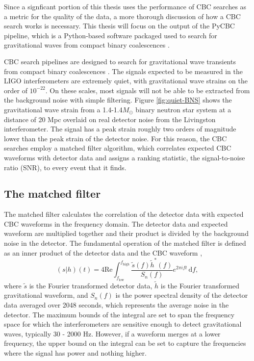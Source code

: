 Since a signficant portion of this thesis uses the performance of 
CBC searches as a metric for the quality of the 
data, a more thorough discussion of how a CBC search 
works is necessary. This thesis will focus on the output of the PyCBC 
pipeline, which is a Python-based software packaged used to search for 
gravitational waves from compact binary coalescences \cite{Usman:2015kfa,pycbc-github}.

CBC search pipelines are designed to search for gravitational wave transients 
from compact binary coalescences \cite{Usman:2015kfa}. 
The signals expected to be measured in the LIGO interferometers are extremely quiet, 
with gravitational wave strains on the order of $10^{-22}$. On these scales, most 
signals will not be able to be extracted from the background noise with simple filtering. 
Figure \ref{fig:quiet-BNS} shows the gravitational wave strain from a 1.4-1.4$M_{\odot}$ 
binary neutron star system at a distance of 20 Mpc overlaid on real detector noise from 
the Livingston 
interferometer. The signal has a peak strain roughly two orders of magnitude lower than 
the peak strain of the detector noise. 
For this reason, the CBC searches employ a matched filter algorithm, which correlates 
expected CBC
waveforms with detector data and assigns a ranking statistic, the signal-to-noise 
ratio (SNR), to every event that it finds. 

\subsection{The matched filter}

The matched filter calculates the correlation of the detector data with expected CBC 
waveforms in the frequency domain. The detector data and expected waveform are 
multiplied together and their product is divided by the background noise in the detector. 
The fundamental operation of the matched filter is defined as an inner product of the 
detector data and the CBC waveform \cite{Allen:2005fk},
\begin{equation}
(s|h)(t) = 4\mathrm{Re}\int_{f_\mathrm{low}}^{f_\mathrm{high}} \frac{\tilde{s}(f)\tilde{h}^*(f)}{S_n (f)}e^{2\pi i f t}\, \mathrm{d}f,
\label{eq:inner-product}
\end{equation}
where $\tilde{s}$ is the Fourier transformed detector data, $\tilde{h}$ is the Fourier
transformed gravitational waveform, and $S_n (f)$ is the power spectral
density of the detector data averaged over 2048 seconds, which represents the average 
noise in the detector. The maximum bounds of the integral are set to span the frequency space 
for which the interferometers are sensitive enough to detect gravitational waves, 
typically 30 - 2000 Hz. However, if a waveform merges at a lower frequency, the upper bound 
on the integral can be set to capture the frequencies where the signal has power and 
nothing higher.

